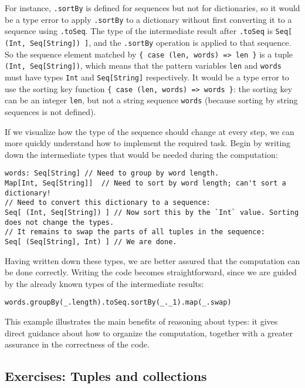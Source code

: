 For instance, \lstinline!.sortBy! is defined for sequences but not
for dictionaries, so it would be a type error to
apply \lstinline!.sortBy! to a dictionary without first converting
it to a sequence using \lstinline!.toSeq!. The type of the intermediate
result after \lstinline!.toSeq! is \lstinline!Seq[ (Int, Seq[String]) ]!,
and the \lstinline!.sortBy! operation is applied to that sequence.
So the sequence element matched by \lstinline!{ case (len, words) => len }!
is a tuple \lstinline!(Int, Seq[String])!, which means that the pattern
variables \lstinline!len! and \lstinline!words! must have types
\lstinline!Int! and \lstinline!Seq[String]! respectively. It would
be a type error to use the sorting key function \lstinline!{ case (len, words) => words }!:
the sorting key can be an integer \lstinline!len!, but not a string
sequence \lstinline!words! (because sorting by string sequences is
not defined).

If we visualize how the type of the sequence should change at every
step, we can more quickly understand how to implement the required
task. Begin by writing down the intermediate types that would be needed
during the computation:
\begin{lstlisting}
words: Seq[String] // Need to group by word length.
Map[Int, Seq[String]]  // Need to sort by word length; can't sort a dictionary!
// Need to convert this dictionary to a sequence:
Seq[ (Int, Seq[String]) ] // Now sort this by the `Int` value. Sorting does not change the types.
// It remains to swap the parts of all tuples in the sequence:
Seq[ (Seq[String], Int) ] // We are done.
\end{lstlisting}
Having written down these types, we are better assured that the computation
can be done correctly. Writing the code becomes straightforward, since
we are guided by the already known types of the intermediate results:
\begin{lstlisting}
words.groupBy(_.length).toSeq.sortBy(_._1).map(_.swap)
\end{lstlisting}

This example illustrates the main benefits of reasoning about types:
it gives direct guidance about how to organize the computation, together
with a greater assurance in the correctness of the code.

\subsection{Exercises: Tuples and collections}

